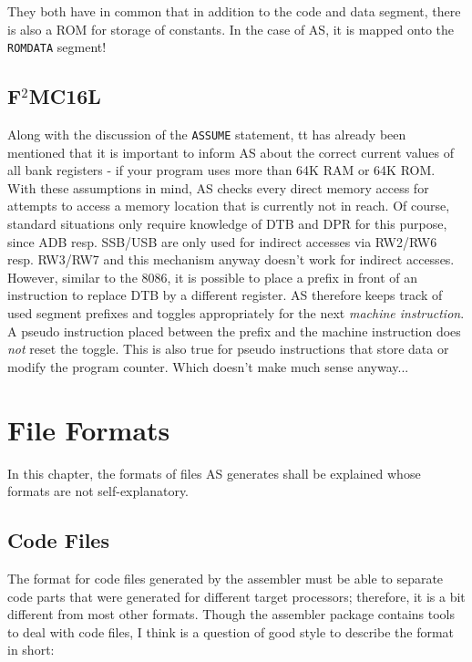 \documentclass[12pt,twoside]{report}
\newcommand{\tty}[1]{{\tt #1}}
\begin{document}
They both have in common that in addition to the code and data segment,
there is also a ROM for storage of constants.  In the case of AS, it is
mapped onto the \tty{ROMDATA} segment!


\section{F$^2$MC16L}

Along with the discussion of the {\tt ASSUME} statement, tt has already
been mentioned that it is important to inform AS about the correct current
values of all bank registers - if your program uses more than 64K RAM or
64K ROM.  With these assumptions in mind, AS checks every direct memory
access for attempts to access a memory location that is currently not in
reach.  Of course, standard situations only require knowledge of DTB and
DPR for this purpose, since ADB resp. SSB/USB are only used for indirect
accesses via RW2/RW6 resp. RW3/RW7 and this mechanism anyway doesn't work
for indirect accesses.  However, similar to the 8086, it is possible to
place a prefix in front of an instruction to replace DTB by a different
register.  AS therefore keeps track of used segment prefixes and
toggles appropriately for the next {\em machine instruction}.  A pseudo
instruction placed between the prefix and the machine instruction does
{\em not} reset the toggle.  This is also true for pseudo instructions
that store data or modify the program counter.  Which doesn't make much
sense anyway...


\cleardoublepage
\chapter{File Formats}

In this chapter, the formats of files AS generates shall be explained
whose formats are not self-explanatory.


\section{Code Files}
\label{SectCodeFormat}

The format for code files generated by the assembler must be able to
separate code parts that were generated for different target
processors; therefore, it is a bit different from most other formats. 
Though the assembler package contains tools to deal with code files,
I think is a question of good style to describe the format in short:
\end{document}
